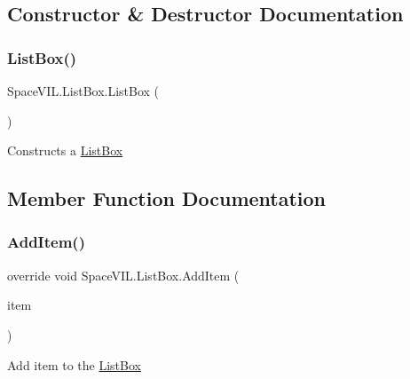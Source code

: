 \subsection{Constructor \& Destructor Documentation}
\mbox{\label{class_space_v_i_l_1_1_list_box_a8978541c968c377b489f94685336a2da}} 
\subsubsection{\texorpdfstring{List\+Box()}{ListBox()}}
{\footnotesize\ttfamily Space\+V\+I\+L.\+List\+Box.\+List\+Box (\begin{DoxyParamCaption}{ }\end{DoxyParamCaption})}



Constructs a \mbox{\hyperlink{class_space_v_i_l_1_1_list_box}{List\+Box}} 



\subsection{Member Function Documentation}
\mbox{\label{class_space_v_i_l_1_1_list_box_a3650d9e40035bd0d22c30b475a0a90f0}} 
\subsubsection{\texorpdfstring{Add\+Item()}{AddItem()}}
{\footnotesize\ttfamily override void Space\+V\+I\+L.\+List\+Box.\+Add\+Item (\begin{DoxyParamCaption}\item[{\mbox{\hyperlink{interface_space_v_i_l_1_1_core_1_1_i_base_item}{I\+Base\+Item}}}]{item }\end{DoxyParamCaption})\hspace{0.3cm}{\ttfamily [virtual]}}



Add item to the \mbox{\hyperlink{class_space_v_i_l_1_1_list_box}{List\+Box}} 



